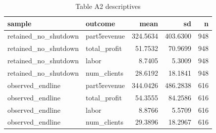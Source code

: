 \begin{table}

\caption{Table A2 descriptives}
\centering
\begin{tabular}[t]{llrrr}
\toprule
sample & outcome & mean & sd & n\\
\midrule
retained\_no\_shutdown & part5revenue & 324.5634 & 403.6300 & 948\\
retained\_no\_shutdown & total\_profit & 51.7532 & 70.9699 & 948\\
retained\_no\_shutdown & labor & 8.7405 & 5.3009 & 948\\
retained\_no\_shutdown & num\_clients & 28.6192 & 18.1841 & 948\\
observed\_endline & part5revenue & 344.0426 & 486.2838 & 616\\
\addlinespace
observed\_endline & total\_profit & 54.3555 & 84.2586 & 616\\
observed\_endline & labor & 8.8766 & 5.5709 & 616\\
observed\_endline & num\_clients & 29.3896 & 18.2967 & 616\\
\bottomrule
\end{tabular}
\end{table}
